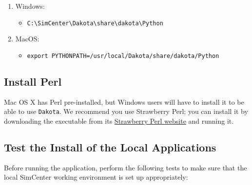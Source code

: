 \begin{enumerate}
\item Windows:
\begin{itemize}
    \item \texttt{C:\textbackslash SimCenter\textbackslash Dakota\textbackslash share\textbackslash dakota\textbackslash Python}
\end{itemize}

\item MacOS:
\begin{itemize}
    \item \texttt{export PYTHONPATH=/usr/local/Dakota/share/dakota/Python}
\end{itemize}
\end{enumerate}

\subsection{Install  Perl}

Mac OS X has Perl pre-installed, but Windows users will have to
install it to be able to use \texttt{Dakota}. We recommend you use Strawberry
Perl; you can install it by downloading the executable from
its \href{http://strawberryperl.com}{Strawberry Perl website} and
running it.

\subsection{Test the Install of the Local Applications}

Before running the \texttt{\getsoftwarename{}} application, perform the following tests to
make sure that the local SimCenter working environment is set up
appropriately:


